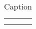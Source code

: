 \begin{table}[t]
    \centering
    \begin{tabular}{c|c}
         &  \\
         & 
    \end{tabular}
    \caption{Caption}
    \label{result_table}
\end{table}